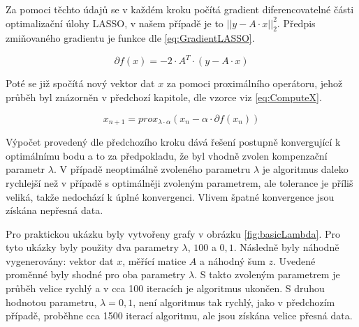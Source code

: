 \documentclass[FM,BP]{tulthesis}
\newcounter{Vzorce}
\begin{document}
Za pomoci těchto údajů se v každém kroku počítá gradient diferencovatelné části optimalizační úlohy LASSO, v našem případě je to $\left|\right|y-A \cdot x\left|\right|_{2}^{2}$. Předpis zmiňovaného gradientu je funkce dle \ref{eq:GradientLASSO}.

\begin{equation} \label{eq:GradientLASSO}  \tag{Vzorec \theVzorce}
\partial f(x) = -2 \cdot A^T \cdot (y-A \cdot x)
\end{equation}

Poté se již spočítá nový vektor dat $x$ za pomoci proximálního operátoru, jehož průběh byl znázorněn v předchozí kapitole, dle vzorce viz \ref{eq:ComputeX}. 

\begin{equation} \label{eq:ComputeX}  \tag{Vzorec \theVzorce}
x_{n+1} = prox_{\lambda \cdot \alpha}(x_{n}- \alpha \cdot \partial f(x_{n}))
\end{equation}

Výpočet provedený dle předchozího kroku dává řešení postupně konvergující k optimálnímu bodu a to za předpokladu, že byl vhodně zvolen kompenzační parametr $\lambda$. V případě neoptimálně zvoleného parametru $\lambda$ je algoritmus daleko rychlejší než v případě s optimálněji zvoleným parametrem, ale tolerance je příliš veliká, takže nedochází k úplné konvergenci. Vlivem špatné konvergence jsou získána nepřesná data.

Pro praktickou ukázku byly vytvořeny grafy v obrázku \ref{fig:basicLambda}. Pro tyto ukázky byly použity dva parametry $\lambda$, $100$ a $0,1$. Následně byly náhodně vygenerovány: vektor dat $x$, měřící matice $A$ a náhodný šum $z$. Uvedené proměnné byly shodné pro oba parametry $\lambda$. S takto zvoleným parametrem je průběh velice rychlý a v cca 100 iteracích je algoritmus ukončen. S druhou hodnotou parametru, $\lambda = 0,1$, není algoritmus tak rychlý, jako v předchozím případě, proběhne cca 1500 iterací algoritmu, ale jsou získána velice přesná data.
\end{document}
